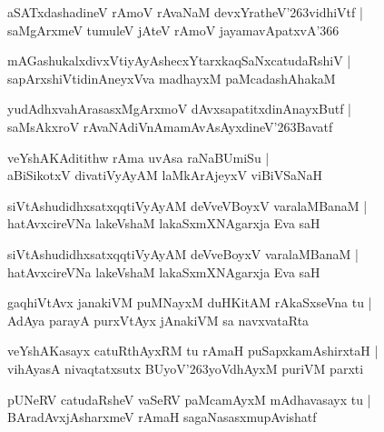 \documentclass[twoside,12pt,openright]{book}
\def\S{\char'263}
\newcounter{shloka}[chapter]
\begin{document}
\begin{shloka}%
aSATxdashadineV rAmoV rAvaNaM devxYratheV\S vidhiVtf |\\
saMgArxmeV tumuleV jAteV rAmoV jayamavApatxvA\char'366
\end{shloka}

\begin{shloka}%
mAGashukalxdivxVtiyAyAshecxYtarxkaqSaNxcatudaRshiV |\\
sapArxshiVtidinAneyxVva madhayxM paMcadashAhakaM 
\end{shloka}

\begin{shloka}%
yudAdhxvahArasasxMgArxmoV dAvxsapatitxdinAnayxButf |\\
saMsAkxroV rAvaNAdiVnAmamAvAsAyxdineV\S Bavatf 
\end{shloka}

\begin{shloka}%
veYshAKAditithw rAma uvAsa raNaBUmiSu |\\
aBiSikotxV divatiVyAyAM laMkArAjeyxV viBiVSaNaH 
\end{shloka}


\begin{shloka}%
siVtAshudidhxsatxqqtiVyAyAM deVveVBoyxV varalaMBanaM |\\
hatAvxcireVNa lakeVshaM lakaSxmXNAgarxja Eva saH 
\end{shloka}

\begin{shloka}%
siVtAshudidhxsatxqqtiVyAyAM deVveBoyxV varalaMBanaM |\\
hatAvxcireVNa lakeVshaM lakaSxmXNAgarxja Eva saH 
\end{shloka}

\begin{shloka}%
gaqhiVtAvx janakiVM puMNayxM duHKitAM rAkaSxseVna tu |\\
AdAya parayA purxVtAyx jAnakiVM sa navxvataRta 
\end{shloka}

\begin{shloka}%
veYshAKasayx catuRthAyxRM tu rAmaH puSapxkamAshirxtaH |\\
vihAyasA nivaqtatxsutx BUyoV\S yoVdhAyxM puriVM parxti
\end{shloka}

\begin{shloka}%
pUNeRV catudaRsheV vaSeRV paMcamAyxM mAdhavasayx tu |\\
BAradAvxjAsharxmeV rAmaH sagaNasasxmupAvishatf 
\end{shloka}
\end{document}
